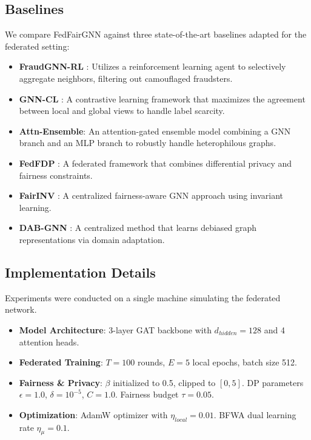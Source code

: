\documentclass[pmlr]{jmlr}%
\begin{document}
\subsection{Baselines}
We compare FedFairGNN against three state-of-the-art baselines adapted for the federated setting:
\begin{itemize}
  \item \textbf{FraudGNN-RL} \citep{dou2020fraudgnnrl}: Utilizes a reinforcement learning agent to selectively aggregate neighbors, filtering out camouflaged fraudsters.
  \item \textbf{GNN-CL} \citep{cheng2024gnncl}: A contrastive learning framework that maximizes the agreement between local and global views to handle label scarcity.
  \item \textbf{Attn-Ensemble}: An attention-gated ensemble model combining a GNN branch and an MLP branch to robustly handle heterophilous graphs.
  \item \textbf{FedFDP} \citep{ling2024fedfdp}: A federated framework that combines differential privacy and fairness constraints.
  \item \textbf{FairINV} \citep{zhu2024fairinv}: A centralized fairness-aware GNN approach using invariant learning.
  \item \textbf{DAB-GNN} \citep{lee2025dabgnn}: A centralized method that learns debiased graph representations via domain adaptation.
\end{itemize}

\subsection{Implementation Details}
Experiments were conducted on a single machine simulating the federated network.
\begin{itemize}
  \item \textbf{Model Architecture}: 3-layer GAT backbone with $d_{hidden}=128$ and 4 attention heads.
  \item \textbf{Federated Training}: $T=100$ rounds, $E=5$ local epochs, batch size 512.
  \item \textbf{Fairness \& Privacy}: $\beta$ initialized to 0.5, clipped to $[0,5]$. DP parameters $\epsilon=1.0$, $\delta=10^{-5}$, $C=1.0$. Fairness budget $\tau=0.05$.
  \item \textbf{Optimization}: AdamW optimizer with $\eta_{local}=0.01$. BFWA dual learning rate $\eta_\mu=0.1$.
\end{itemize}
\end{document}
